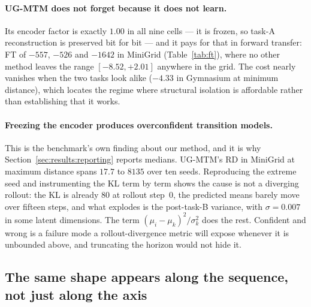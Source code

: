 \paragraph{UG-MTM does not forget because it does not learn.} Its encoder factor
is exactly $1.00$ in all nine cells --- it is frozen, so task-A reconstruction is
preserved bit for bit --- and it pays for that in forward transfer: FT of $-557$,
$-526$ and $-1642$ in MiniGrid (Table~\ref{tab:ft}), where no other method
leaves the range $[-8.52, +2.01]$ anywhere in the grid. The cost nearly
vanishes when the two tasks
look alike ($-4.33$ in Gymnasium at minimum distance), which locates the regime
where structural isolation is affordable rather than establishing that it works.

\paragraph{Freezing the encoder produces overconfident transition models.} This
is the benchmark's own finding about our method, and it is why
Section~\ref{sec:results:reporting} reports medians. UG-MTM's RD in MiniGrid at
maximum distance spans $17.7$ to $8135$ over ten seeds. Reproducing the extreme
seed and instrumenting the KL term by term shows the cause is not a diverging
rollout: the KL is already $80$ at rollout step~0, the predicted means barely
move over fifteen steps, and what explodes is the post-task-B variance, with
$\sigma = 0.007$ in some latent dimensions. The term
$(\mu_i - \mu_k)^2 / \sigma_k^2$ does the rest. Confident and wrong is a failure
mode a rollout-divergence metric will expose whenever it is unbounded above, and
truncating the horizon would not hide it.

\begin{table}[t]
  \centering
  
  \caption{FT (forward transfer) by method and cell, in pixel space: held-out
  task-B reconstruction of a model trained on B from scratch minus that of the
  pretrained model. Positive means knowledge of task~A helped.}
  \label{tab:ft}
\end{table}

\subsection{The same shape appears along the sequence, not just along the axis}
\label{sec:results:sequence}

\begin{table}[t]
  \centering
  
  \caption{Retention of the first task as a four-task MiniGrid sequence goes
  on. The three numeric columns are RD of $T_1$ measured against the model as
  it stood when $T_1$ finished; \textbf{bold} marks each method's peak, and the
  Peak column counts how many of its five seeds peak there rather than reading
  the median curve. \emph{Pixel} $\times$ is held-out reconstruction of $T_1$
  after $T_4$, as a factor of what that model had when $T_1$ finished. The last
  row is how hard the task trained at each stage was to fit.}
  \label{tab:sequence}
\end{table}


